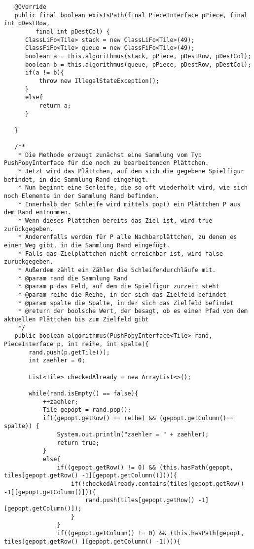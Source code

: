 \documentclass{pi2}
\begin{document}
\begin{lstlisting}
   @Override
   public final boolean existsPath(final PieceInterface pPiece, final int pDestRow,
         final int pDestCol) {
      ClassLiFo<Tile> stack = new ClassLiFo<Tile>(49);
      ClassFiFo<Tile> queue = new ClassFiFo<Tile>(49);
      boolean a = this.algorithmus(stack, pPiece, pDestRow, pDestCol);
      boolean b = this.algorithmus(queue, pPiece, pDestRow, pDestCol);
      if(a != b){
    	  throw new IllegalStateException();
      }
      else{
    	  return a;
      }
     
   }
   
   /**
    * Die Methode erzeugt zunächst eine Sammlung vom Typ PushPopyInterface für die noch zu bearbeitenden Plättchen.
    * Jetzt wird das Plättchen, auf dem sich die gegebene Spielfigur befindet, in die Sammlung Rand eingefügt. 
    * Nun beginnt eine Schleife, die so oft wiederholt wird, wie sich noch Elemente in der Sammlung Rand befinden.
    * Innerhalb der Schleife wird mittels pop() ein Plättchen P aus dem Rand entnommen.
    * Wenn dieses Plättchen bereits das Ziel ist, wird true zurückgegeben.
    * Anderenfalls werden für P alle Nachbarplättchen, zu denen es einen Weg gibt, in die Sammlung Rand eingefügt.
    * Falls das Zielplättchen nicht erreichbar ist, wird false zurückgegeben.
    * Außerdem zählt ein Zähler die Schleifendurchläufe mit.
    * @param rand die Sammlung Rand
    * @param p das Feld, auf dem die Spielfigur zurzeit steht
    * @param reihe die Reihe, in der sich das Zielfeld befindet
    * @param spalte die Spalte, in der sich das Zielfeld befindet
    * @return der boolsche Wert, der besagt, ob es einen Pfad von dem aktuellen Plättchen bis zum Zielfeld gibt
    */
   public boolean algorithmus(PushPopyInterface<Tile> rand, PieceInterface p, int reihe, int spalte){
	   rand.push(p.getTile());
	   int zaehler = 0;
	   
	   List<Tile> checkedAlready = new ArrayList<>();
	   
	   while(rand.isEmpty() == false){
		   ++zaehler;
		   Tile gepopt = rand.pop();
		   if((gepopt.getRow() == reihe) && (gepopt.getColumn()== spalte)) {
			   System.out.println("zaehler = " + zaehler);
			   return true;
		   }
		   else{
			   if((gepopt.getRow() != 0) && (this.hasPath(gepopt, tiles[gepopt.getRow() -1][gepopt.getColumn()]))){
				   if(!checkedAlready.contains(tiles[gepopt.getRow() -1][gepopt.getColumn()])){
					   rand.push(tiles[gepopt.getRow() -1][gepopt.getColumn()]);
				   }
			   }
			   if((gepopt.getColumn() != 0) && (this.hasPath(gepopt, tiles[gepopt.getRow() ][gepopt.getColumn() -1]))){
				   

\end{lstlisting}
\end{document}
